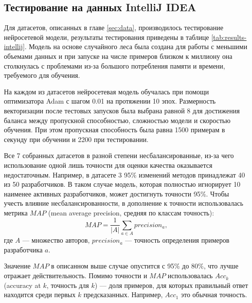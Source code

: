 \subsection{Тестирование на данных IntelliJ IDEA}

Для датасетов, описанных в главе \ref{sec:data}, производилось тестирование нейросетевой модели, результаты тестирования приведены в таблице \ref{tab:results-intellij}. Модель на основе случайного леса была создана для работы с меньшими объемами данных и при запуске на числе примеров близком к миллиону она столкнулась с проблемами из-за большого потребления памяти и времени, требуемого для обучения.

На каждом из датасетов нейросетевая модель обучалась при помощи оптимизатора Adam \cite{Adam} с шагом 0.01 на протяжении 10 эпох. Размерность векторизации после тестовых запусков была выбрана равной 8 для достижения баланса между пропускной способностью, сложностью модели и скоростью обучения. При этом пропускная способность была равна 1500 примерам в секунду при обучении и 2200 при тестировании.

Все 7 собранных датасетов в разной степени несбалансированные, из-за чего использование одной лишь точности для оценки качества оказывается недостаточным. Например, в датасете 3 95\% изменений методов принадлежат 40 из 50 разработчиков. В таком случае модель, которая полностью игнорирует 10 наименее активных разработчиков, может достигнуть точности 95\%. Чтобы учесть влияние несбалансированности, в дополнение к точности использовалась метрика $MAP$ (mean average precision, средняя по классам точность):
$$
MAP = \frac{1}{|A|}\sum\limits_{a \in A} precision_a,
$$
где $A$ — множество авторов, $precision_a$ — точность определения примеров разработчика $a$.

Значение $MAP$ в описанном выше случае опустится с 95\% до 80\%, что лучше отражает действительность. Помимо точности и $MAP$ использовалась $Acc_k$ (accuracy at $k$, точность для $k$) — доля примеров, для которых правильный ответ находится среди первых $k$ предсказанных. Например, $Acc_1$ это обычная точность.

